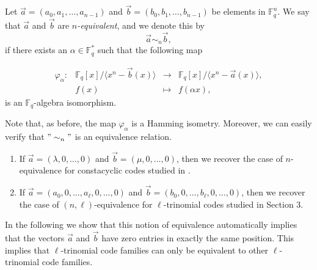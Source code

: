 \documentclass[12pt]{elsarticle}
\newcommand{\hlc}[2][yellow]{ {\sethlcolor{#1} \hl{#2}} }
\newcommand{\Fq}{\mathbb{F}_{q}}
\theoremstyle{break}
{\theorembodyfont{\upshape}
    \newtheorem{theorem}{Theorem}[section] %
    \newtheorem{lemma}[theorem]{Lemma} %
    \newtheorem{proposition}[theorem]{Proposition}
    \newtheorem{corollary}[theorem]{Corollary}
    \newtheorem{definition}[theorem]{Definition}
    \newtheorem{example}[theorem]{Example}
    \newtheorem{remark}[theorem]{Remark}
    \newtheorem{conjecture}[theorem]{Conjecture}
    \newtheorem*{proof}{{Proof}}
	\newtheorem*{notation}{Notation}
	\newtheorem*{main}{Cain Theorem}
	\newtheorem*{problem}{Problem}
}
\begin{document}
 \begin{definition}
Let $ \vec{a} = (a_0, a_1, \ldots, a_{n-1}) $ and $ \vec{b} = (b_0, b_1, \ldots, b_{n-1}) $ be elements in $\mathbb{F}_q^n .$
We say that $ \vec{a} $ and $ \vec{b} $ are \textit{$ n $-equivalent}, and we denote this by 
$$ \vec{a} \sim_n \vec{b}, $$ 
if there exists an 
$ \alpha \in \mathbb{F}_q^* $ such that the following map

  \begin{equation}
  	\begin{array}{cccc}
  	\varphi_{\alpha}:& \mathbb{F}_q[x] /\langle x^n-\vec{b}(x) \rangle  &\longrightarrow & \mathbb{F}_q[x] /\langle x^n-\vec{a}(x) \rangle, \\ 
  	& f(x) & \longmapsto &  f(\alpha x),
  	\end{array}
  	\end{equation} 
is an $\Fq$-algebra isomorphism. 
 \end{definition}
 Note that, as before, the map $\varphi_\alpha$ is a Hamming isometry.  Moreover, we can easily verify that $ " \sim_n "$ is an equivalence relation.

 \begin{remark}
 \begin{enumerate}
     \item  If $ \vec{a} = (\lambda, 0, \ldots, 0) $ and $ \vec{b} = (\mu, 0, \ldots, 0) $, then we recover the case of $n$-equivalence for constacyclic codes studied in \cite{Chen2014}.
     \item  If $ \vec{a} = (a_0, 0, \ldots,a_{\ell},0,\ldots, 0) $ and  $ \vec{b} = (b_0, 0, \ldots,b_{\ell},0,\ldots, 0) $, then we recover the case of $(n,\ell)$-equivalence for $\ell$-trinomial  codes studied in Section 3.
     \end{enumerate}
 \end{remark}

 In the following we show that this notion of equivalence automatically implies that the vectors $\vec{a}$ and $\vec{b}$ have zero entries in exactly the same position. This implies that $\ell$-trinomial code families can only be equivalent to other $\ell$-trinomial code families.
 
\end{document}
